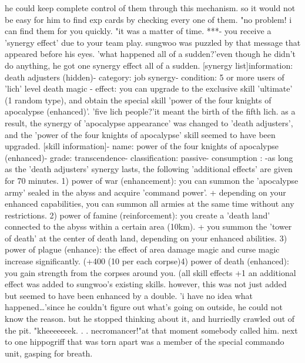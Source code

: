  he could keep complete control of them through this mechanism.
 so it would not be easy for him to find exp cards by checking every one of them.
"no problem! i can find them for you quickly.
"it was a matter of time.
***- you receive a 'synergy effect' due to your team play.
sungwoo was puzzled by that message that appeared before his eyes.
 'what happened all of a sudden?'even though he didn't do anything, he got one synergy effect all of a sudden.
 [synergy list]information: death adjusters (hidden)- category: job synergy- condition: 5 or more users of 'lich' level death magic
- effect: you can upgrade to the exclusive skill 'ultimate' (1 random type), and obtain the special skill 'power of the four knights of apocalypse (enhanced)'.
'five lich people?'it meant the birth of the fifth lich.
as a result, the synergy of 'apocalypse appearance' was changed to 'death adjusters', and the 'power of the four knights of apocalypse' skill seemed to have been upgraded.
[skill information]- name: power of the four knights of apocalypse (enhanced)- grade: transcendence- classification: passive- consumption : -as long as the 'death adjusters' synergy lasts, the following 'additional effects' are given for 70 minutes.
1) power of war (enhancement): you can summon the 'apocalypse army' sealed in the abyss and acquire 'command power'.
+ depending on your enhanced capabilities, you can summon all armies at the same time without any restrictions.
2) power of famine (reinforcement): you create a 'death land' connected to the abyss within a certain area (10km).
+ you summon the 'tower of death' at the center of death land, depending on your enhanced abilities.
3) power of plague (enhance): the effect of area damage magic and curse magic increase significantly.
 (+400%
 (10 per each corpse)4) power of death (enhanced): you gain strength from the corpses around you.
 (all skill effects +1%
an additional effect was added to sungwoo's existing skills.
 however, this was not just added but seemed to have been enhanced by a double.
'i have no idea what happened…'since he couldn't figure out what's going on outside, he could not know the reason.
but he stopped thinking about it, and hurriedly crawled out of the pit.
"kheeeeeeek.
.
.
necromancer!"at that moment somebody called him.
 next to one hippogriff that was torn apart was a member of the special commando unit, gasping for breath.
